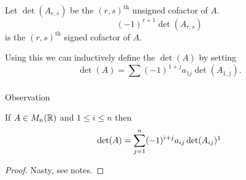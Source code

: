 \documentclass[10pt, a4paper]{article}
\begin{document}
Let $\det(A_{r, s})$ be the $(r, s)^{\text{th}}$ unsigned cofactor of $A$.
\[
(-1) ^ {r + 1}\det(A_{r, s})
\]
is the $(r, s)^{\text{th}}$ signed cofactor of $A$.

Using this we can inductively define the $\det(A)$ by setting
\[
\det(A) = \sum_{}^{}(-1) ^ {1 + j}a_{1j}\det(A_{1, j}).
\]

Observation
\begin{proposition}
    If $A \in M_n(\mathbb{R})$ and $1 \leq i \leq n$ then
    \[
    \det(A) = \sum_{j = 1}^{n}(-1) ^ {i + j}a_{ij}\det(A_{ij})\footnotemark
    \]
    \begin{proof}
        Nasty,
        see notes.
    \end{proof}
\end{proposition}
\end{document}
